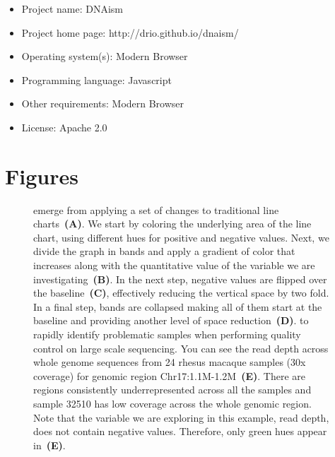 \documentclass[twocolumn]{bmcart}
\begin{document}
\begin{itemize}
  \item Project name: DNAism
  \item Project home page: http://drio.github.io/dnaism/
  \item Operating system(s): Modern Browser
  \item Programming language: Javascript
  \item Other requirements: Modern Browser
  \item License: Apache 2.0
\end{itemize}





\section*{Figures}
\begin{figure}[h!]

\caption{
   emerge from applying a set of changes to traditional line
  charts~\textbf{(A)}. We start by coloring the underlying area of the line chart,
  using different hues for positive and negative values. Next, we divide the
  graph in bands and apply a gradient of color that increases along with the
  quantitative value of the variable we are investigating~\textbf{(B)}. In the
  next step, negative values are flipped over the baseline~\textbf{(C)},
  effectively reducing the vertical space by two fold. In a final step, bands are
  collapsed making all of them start at the baseline and providing another level
  of space reduction~\textbf{(D)}.  
   to rapidly identify problematic samples
  when performing quality control on large scale sequencing.
  You can see the read depth across whole genome sequences from 24 rhesus macaque
  samples (30x coverage) for genomic region Chr17:1.1M-1.2M~\textbf{(E)}.
  There are regions consistently underrepresented across all the
  samples and sample 32510 has low coverage across the whole genomic region.
  Note that the variable we are exploring in this example, read depth, does not
  contain negative values. Therefore, only green hues appear in~\textbf{(E)}.
}\label{fig:01}

\end{figure}
\end{document}
